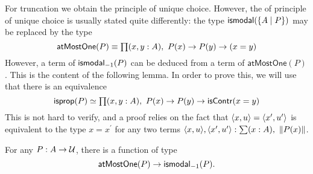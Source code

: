 For truncation we obtain the principle of unique choice. 
However, the of principle of unique choice is usually stated quite differently:
the type $\mathsf{ismodal}(\{A\mid P\})$ may be replaced by the type
\begin{equation*}
\mathsf{atMostOne}(P) \equiv  \prd{x,y:A} P(x)\to P(y)\to(x= y)
\end{equation*}
However, a term of $\mathsf{ismodal}_{-1}(P)$ can be deduced from a term of $\mathsf{atMostOne}(P)$. This is the content of the following
lemma. In order to prove this, we will use that there is an equivalence
\begin{equation*}
\mathsf{isprop}(P)\simeq \prd{x,y:A} P(x)\to P(y)\to\mathsf{isContr}(x= y)
\end{equation*}
This is not hard to verify, and a proof relies on the fact that ${\langle x,u\rangle}={\langle x^\prime,u^\prime\rangle}$ is equivalent to the type
$x= x^\prime$ for any two terms $\pairr{x,u},\pairr{x^\prime,u^\prime}:\sum(x:A),\ \|P(x)\|$.


\begin{lem}\label{lem:atmostone_to_atlevel}
For any $P:A\to\mathcal{U}$, there is a function of type
\begin{equation*}
\mathsf{atMostOne}(P)\to\mathsf{ismodal}_{-1}(P).
\end{equation*}
\end{lem}

